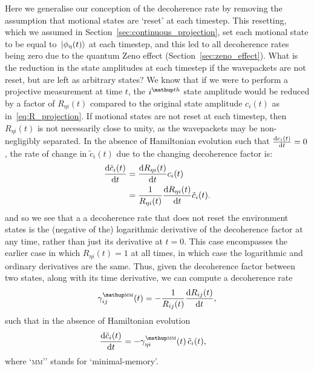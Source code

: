 Here we generalise our conception of the decoherence rate by removing the assumption that motional states are `reset' at each timestep. This resetting, which we assumed in Section~\ref{sec:continuous_projection}, set each motional state to be equal to $\ket{\phi_\eta(t)}$ at each timestep, and this led to all decoherence rates being zero due to the quantum Zeno effect (Section~\ref{sec:zeno_effect}). What is the reduction in the state amplitudes at each timestep if the wavepackets are not reset, but are left as arbitrary states? We know that if we were to perform a projective measurement at time $t$, the $i^\up{th}$ state amplitude would be reduced by a factor of $R_{\eta i}(t)$ compared to the original state amplitude $c_i(t)$ as in~\eqref{eq:R_projection}. If motional states are not reset at each timestep, then $R_{\eta i}(t)$ is not necessarily close to unity, as the wavepackets may be non-negligibly separated. In the absence of Hamiltonian evolution such that $\dv{c_i(t)}{t}=0$, the rate of change in $\tilde c_i(t)$ due to the changing decoherence factor is:
\begin{align}
\dv{\tilde c_i(t)}{t} &= \dv{R_{\eta i}(t)}{t} c_i(t)\\
&= \frac1{R_{\eta i}(t)}\dv{R_{\eta i}(t)}{t} \tilde c_i(t).
\end{align}
and so we see that a a decoherence rate that does not reset the environment states is the (negative of the) logarithmic derivative of the decoherence factor at any time, rather than just its derivative at $t=0$. This case encompasses the earlier case in which $R_{\eta i}(t) = 1$ at all times, in which case the logarithmic and ordinary derivatives are the same. Thus, given the decoherence factor between two states, along with its time derivative, we can compute a decoherence rate
\begin{align}
\gamma^\up{\textsc{mm}}_{ij}(t) =  -\frac1{R_{ij}(t)}\dv{R_{ij}(t)}{t},
\end{align}
such that in the absence of Hamiltonian evolution
\begin{align}
\dv{\tilde c_i(t)}{t} &= -\gamma^\up{\textsc{mm}}_{\eta i}(t)\,\tilde c_i(t),
\end{align}
where `\textsc{mm}'' stands for `minimal-memory'.

